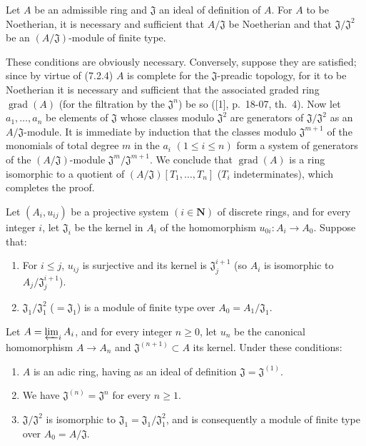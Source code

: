 \begin{corollary}[7.2.6]
\label{0.7.2.6}
Let $A$ be an admissible ring and $\mathfrak J$ an ideal of definition of $A$.
For $A$ to be Noetherian, it is necessary and sufficient that $A/\mathfrak J$ be
Noetherian and that $\mathfrak J/\mathfrak J^2$ be an
$(A/\mathfrak J)$-module of finite type.
\end{corollary}

These conditions are obviously necessary. Conversely, suppose they are
satisfied; since by virtue of (7.2.4) $A$ is complete for the
$\mathfrak J$-preadic topology, for it to be Noetherian it is necessary and sufficient that
the associated graded ring $\operatorname{grad}(A)$ (for the filtration by the
$\mathfrak J^n$) be so ([1], p.~18-07, th.~4). Now let
$a_1,\ldots,a_n$ be elements of $\mathfrak J$ whose classes modulo
$\mathfrak J^2$ are generators of $\mathfrak J/\mathfrak J^2$ as an
$A/\mathfrak J$-module. It is immediate by induction that the classes modulo
$\mathfrak J^{m+1}$ of the monomials of total degree $m$ in the $a_i$
$(1\leq i\leq n)$ form a system of generators of the
$(A/\mathfrak J)$-module $\mathfrak J^m/\mathfrak J^{m+1}$. We conclude that
$\operatorname{grad}(A)$ is a ring isomorphic to a quotient of
$(A/\mathfrak J)[T_1,\ldots,T_n]$ ($T_i$ indeterminates), which completes the
proof.

\begin{proposition}[7.2.7]
\label{0.7.2.7}
Let $(A_i,u_{ij})$ be a projective system $(i\in\mathbf N)$ of discrete rings,
and for every integer $i$, let $\mathfrak J_i$ be the kernel in $A_i$ of
the homomorphism $u_{0i}:A_i\to A_0$. Suppose that:
\begin{enumerate}
  \item[{\upshape a)}] For $i\leq j$, $u_{ij}$ is surjective and its kernel is
    $\mathfrak J_j^{i+1}$ \textup{(so $A_i$ is isomorphic to
    $A_j/\mathfrak J_j^{i+1}$)}.
  \item[{\upshape b)}] $\mathfrak J_1/\mathfrak J_1^2$ ($=\mathfrak J_1$) is a
    module of finite type over $A_0=A_1/\mathfrak J_1$.
\end{enumerate}
Let $A=\varprojlim_i A_i$, and for every integer $n\geq0$, let $u_n$ be
the canonical homomorphism $A\to A_n$ and $\mathfrak J^{(n+1)}\subset A$ its
kernel. Under these conditions:
\begin{enumerate}
  \item[{\upshape(i)}] $A$ is an adic ring, having as an ideal of definition
    $\mathfrak J=\mathfrak J^{(1)}$.
  \item[{\upshape(ii)}] We have $\mathfrak J^{(n)}=\mathfrak J^n$ for every $n\geq1$.
  \item[{\upshape(iii)}] $\mathfrak J/\mathfrak J^2$ is isomorphic to
    $\mathfrak J_1=\mathfrak J_1/\mathfrak J_1^2$, and is consequently a module
    of finite type over $A_0=A/\mathfrak J$.
\end{enumerate}
\end{proposition}

